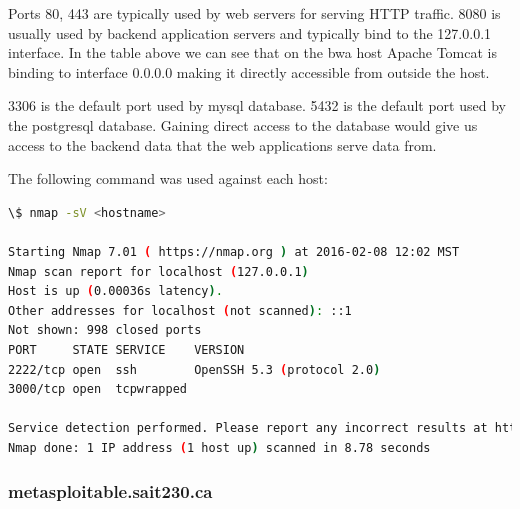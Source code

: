 \documentclass{article}
\begin{document}
Ports 80, 443 are typically used by web servers for serving HTTP traffic.
8080 is usually used by backend application servers and typically bind to the 127.0.0.1
interface. In the table above we can see that on the bwa host Apache Tomcat is binding 
to interface 0.0.0.0 making it directly accessible from outside the host.

3306 is the default port used by mysql database.
5432 is the default port used by the postgresql database.
Gaining direct access to the database would give us access to the backend data
that the web applications serve data from.

\noindent The following command was used against each host:
\begin{lstlisting}[language=bash, firstline=1, lastline=3]
\$ nmap -sV <hostname>

Starting Nmap 7.01 ( https://nmap.org ) at 2016-02-08 12:02 MST
Nmap scan report for localhost (127.0.0.1)
Host is up (0.00036s latency).
Other addresses for localhost (not scanned): ::1
Not shown: 998 closed ports
PORT     STATE SERVICE    VERSION
2222/tcp open  ssh        OpenSSH 5.3 (protocol 2.0)
3000/tcp open  tcpwrapped

Service detection performed. Please report any incorrect results at https://nmap.org/submit/ .
Nmap done: 1 IP address (1 host up) scanned in 8.78 seconds
\end{lstlisting}

\subsubsection{metasploitable.sait230.ca}
\end{document}

